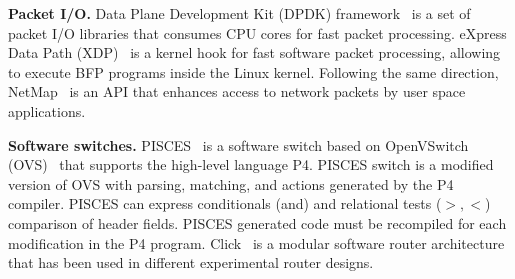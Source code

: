 \textbf{Packet I/O.}   Data Plane Development Kit (DPDK) framework~\cite{DPDK2018} is a set of packet I/O libraries that consumes CPU cores for fast packet processing. 
eXpress Data Path (XDP)~\cite{Hoiland-Jorgensen:2018:EDP:3281411.3281443} is a kernel hook for fast software packet processing, allowing to execute BFP programs inside the Linux kernel.
Following the same direction, NetMap~\cite{rizzo2012netmap} is an API that enhances access to network packets by user space applications.


\textbf{Software switches.} PISCES~\cite{Shahbaz:2016:Pisces} is a software switch based on OpenVSwitch (OVS)~\cite{Pfaff:2015:OpenVSwitch} that supports the high-level language P4. 
PISCES switch is a modified version of OVS with parsing, matching, and actions generated by the P4 compiler. 
PISCES can express conditionals (and) and relational tests ($>,<$) comparison of header fields.
PISCES generated code must be recompiled for each modification in the P4 program. Click~\cite{kohler2000click} is a modular software router architecture that has been used in different experimental router designs.

%

